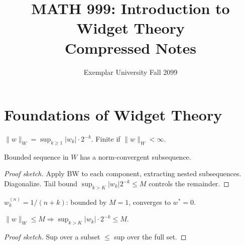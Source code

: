 \documentclass[9pt, a4paper]{article}
\title{\textbf{MATH 999: Introduction to Widget Theory}\\[4pt]
  {\Large Compressed Notes}}
\author{{\small Exemplar University \quad Fall 2099}}
\date{}
\theoremstyle{definition}
\begin{document}
\maketitle
\tableofcontents
\newpage


\section{Foundations of Widget Theory}

\begin{defbox}
$\|w\|_W = \sup_{k \ge 1}|w_k| \cdot 2^{-k}$. Finite if $\|w\|_W < \infty$.
\end{defbox}

\begin{thmbox}
Bounded sequence in $W$ has a norm-convergent subsequence.
\end{thmbox}

\begin{proof}[Proof sketch]
Apply BW to each component, extracting nested subsequences. Diagonalize.
Tail bound $\sup_{k>K}|w_k|2^{-k} \le M$ controls the remainder.
\end{proof}

\begin{exbox}[Example]
$w^{(n)}_k = 1/(n+k)$: bounded by $M=1$, converges to $w^*=0$.
\end{exbox}

\begin{thmbox}
$\|w\|_W \le M \Rightarrow \sup_{k>K}|w_k| \cdot 2^{-k} \le M$.
\end{thmbox}

\begin{proof}[Proof sketch]
Sup over a subset $\le$ sup over the full set.
\end{proof}
\end{document}
